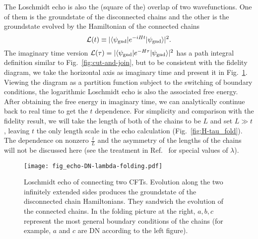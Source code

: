 The Loschmidt echo is also the (square of the) overlap of two wavefunctions. One of them is the groundstate of the disconnected chains and the other is the groundstate evolved by the Hamiltonian of the connected chains
\begin{equation}
\mathcal{L}( t )  \equiv |\langle \psi_{\rm gnd}  | e^{-i H t } | \psi_{\rm gnd} \rangle|^2 .
\end{equation}
The imaginary time version $\mathcal{L}( \tau  ) = |\langle \psi_{\rm gnd}  | e^{-H \tau } | \psi_{\rm gnd} \rangle|^2$ has a path integral definition similar to Fig.~\ref{fig:cut-and-join}, but to be consistent with the fidelity diagram, we take the horizontal axis as imaginary time and present it in Fig.~\ref{fig:echo}. Viewing the diagram as a partition function subject to the switching of boundary conditions, the logarithmic Loschmidt echo is also the associated free energy. After obtaining the free energy in imaginary time, we can analytically continue back to real time to get the $t$ dependence. For simplicity and comparison with the fidelity result, we will take the length of both of the chains to be $L$ and set $L \gg t$, leaving $t$ the only length scale in the echo calculation (Fig.~\ref{fig:H-tau_fold}). The dependence on nonzero $\frac{t}{L}$ and the asymmetry of the lengths of the chains will not be discussed here (see the treatment in Ref.~ for special values of $\lambda$).

\begin{figure}[h]
\centering
\texttt{[image: fig\_echo-DN-lambda-folding.pdf]}
\caption{Loschmidt echo of connecting two CFTs. Evolution along the two infinitely extended sides produces the groundstate of the disconnected chain Hamiltonians. They sandwich the evolution of the connected chains. In the folding picture at the right, $a,b,c$ represent the most general boundary conditions of the chains (for example, $a$ and $c$ are DN according to the left figure).}
\label{fig:echo}
\end{figure}

